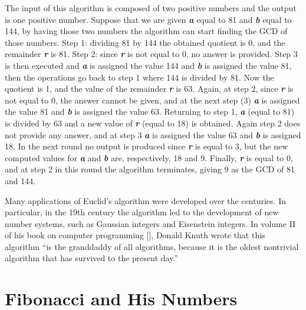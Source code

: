 {{\medskip

The input of this algorithm is composed of two positive numbers and the output is one positive number. Suppose that we are given \textbf{\textit{a}} equal to 81 and \textbf{\textit{b}} equal to 144, by having those two numbers the algorithm can start finding the GCD of those numbers. Step 1: dividing 81 by 144 the obtained quotient is 0, and the remainder \textbf{\textit{r}} is 81. Step 2: since \textbf{\textit{r}} is not equal to 0, no answer is provided. Step 3 is then executed and \textbf{\textit{a}} is assigned the value 144 and \textbf{\textit{b}} is assigned the value 81, then the operations go back to step 1 where 144 is divided by 81. Now the quotient is 1, and the value of the remainder \textbf{\textit{r}} is 63. Again, at step 2, since \textbf{\textit{r}} is not equal to 0, the answer cannot be given, and at the next step (3) \textbf{\textit{a}} is assigned the value 81 and \textbf{\textit{b}} is assigned the value 63. Returning to step 1, \textbf{\textit{a}} (equal to 81) is divided by 63 and a new value of \textbf{\textit{r}} (equal to 18) is obtained. Again step 2 does not provide any answer, and at step 3 \textbf{\textit{a}} is assigned the value 63 and \textbf{\textit{b}} is assigned 18. In the next round no output is produced since \textbf{\textit{r}} is equal to 3, but the new computed values for \textbf{\textit{a}} and \textbf{\textit{b}} are, respectively, 18 and 9. Finally, \textbf{\textit{r}} is equal to 0, and at step 2 in this round the algorithm terminates, giving 9 as the GCD of 81 and 144.

Many applications of Euclid's algorithm were developed over the centuries. In particular, in the 19th century the algorithm led to the development of new number systems, such as Gaussian integers and Eisenstein integers. In volume II of his book on computer programming [\citealt{chap:01:Knuth:1998}], Donald Knuth wrote that this algorithm ``is the granddaddy of all algorithms, because it is the oldest nontrivial algorithm that has survived to the present day.''

\section{\label{sec:1.5}Fibonacci and His Numbers}

}}
